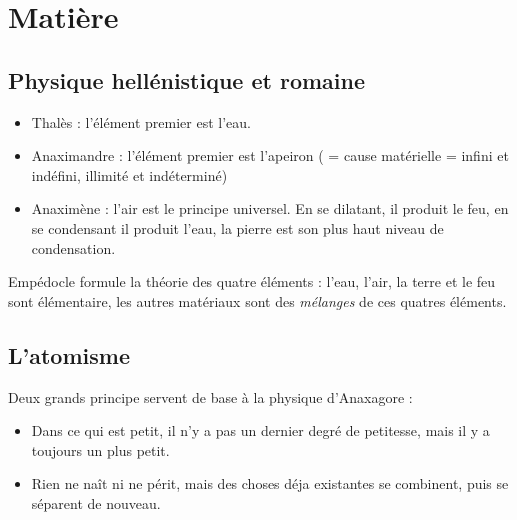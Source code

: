 

\setlength{\fboxsep}{4pt}

\begin{comment}
\end{comment}
\section{Matière}

\subsection{Physique hellénistique et romaine}

\begin{itemize}[leftmargin=1cm, label=, itemsep=5pt]
\item Thalès : l'élément premier est l'eau.
\item Anaximandre : l'élément premier est l'apeiron ( = cause matérielle = infini et indéfini, illimité et indéterminé)
\item Anaximène : l'air est le principe universel. En se dilatant, il produit le feu, en se condensant il produit l'eau, la pierre est son plus haut niveau de condensation.
\end{itemize}

Empédocle formule la théorie des quatre éléments : l'eau, l'air, la terre et le feu sont élémentaire, les autres matériaux sont des {\it mélanges} de ces quatres éléments.

\begin{comment}
\item Platon : les éléments derniers de la matière sont les corps simples.
\end{comment}

\subsection{L'atomisme}

Deux grands principe servent de base à la physique d'Anaxagore :

\begin{itemize}[leftmargin=1cm, label=, itemsep=5pt]
\item Dans ce qui est petit, il n'y a pas un dernier degré de petitesse, mais il y a toujours un plus petit.
\item Rien ne naît ni ne périt, mais des choses déja existantes se combinent, puis se séparent de nouveau.
\end{itemize}


